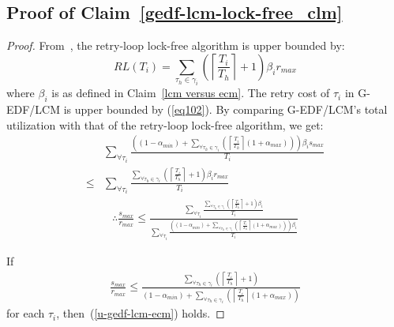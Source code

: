 \documentclass[conference]{sig-alternate}
\begin{document}
\subsection{\label{proof_gedf-lcm-lock-free_clm}Proof of Claim~\ref{gedf-lcm-lock-free_clm}}
\begin{proof}
From~\cite{key-5}, the retry-loop lock-free algorithm is upper bounded by:
\begin{equation}
RL(T_i)=\sum_{\tau_{h}\in\gamma_{i}}\left(\left\lceil\frac{T_{i}}{T_{h}}\right\rceil +1\right)\beta_{i}r_{max}
\label{eq32}\end{equation}
where $\beta_i$ is as defined in Claim~\ref{lcm versus ecm}.
The retry cost of $\tau_i$ in G-EDF/LCM is upper bounded by (\ref{eq102}). By comparing G-EDF/LCM's total utilization with that of the retry-loop lock-free algorithm, we get:
\begin{eqnarray*}
& \sum_{\forall \tau_{i}}\frac{\left((1-\alpha_{min})+\sum_{\forall \tau_{h}\in\gamma_{i}}\left(\left\lceil\frac{T_{i}}{T_{h}}\right\rceil(1+\alpha_{max})\right)\right)\beta_{i}s_{max}}{T_{i}}\\
\le & \sum_{\forall \tau_{i}}\frac{\sum_{\forall \tau_{h}\in\gamma_{i}}\left(\left\lceil\frac{T_{i}}{T_{h}}\right\rceil+1\right)\beta_{i}r_{max}}{T_{i}}\end{eqnarray*}
%
\begin{eqnarray}
\therefore\frac{s_{max}}{r_{max}}\le \frac{\sum_{\forall \tau_{i}}\frac{\sum_{\forall \tau_{h}\in\gamma_{i}}\left(\left\lceil\frac{T_{i}}{T_{h}}\right\rceil+1\right)\beta_{i}}{T_{i}}}{\sum_{\forall \tau_{i}}\frac{\left((1-\alpha_{min})+\sum_{\forall \tau_{h}\in\gamma_{i}}\left(\left\lceil\frac{T_{i}}{T_{h}}\right\rceil(1+\alpha_{max})\right)\right)\beta_{i}}{T_{i}}}
\label{u-gedf-lcm-ecm}\end{eqnarray}

If
\begin{eqnarray}
\frac{s_{max}}{r_{max}}\le \frac{{\sum_{\forall \tau_{h}\in\gamma_{i}}\left(\left\lceil\frac{T_{i}}{T_{h}}\right\rceil+1\right)}}{{(1-\alpha_{min})+\sum_{\forall \tau_{h}\in\gamma_{i}}\left(\left\lceil\frac{T_{i}}{T_{h}}\right\rceil(1+\alpha_{max})\right)}}
\label{t-gedf-lcm-ecm}\end{eqnarray}
for each $\tau_i$, then~(\ref{u-gedf-lcm-ecm}) holds.


\end{proof}
\end{document}
